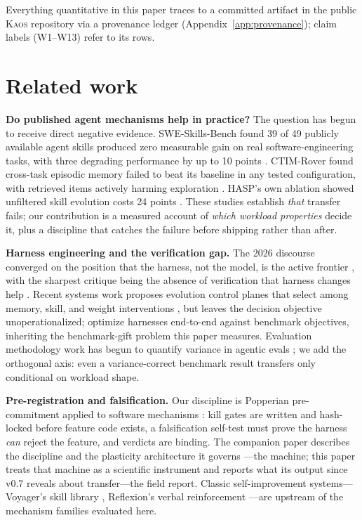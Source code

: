 \documentclass[11pt]{article}
\newcommand{\kaos}{\textsc{Kaos}}
\begin{document}
Everything quantitative in this paper traces to a committed artifact in the public \kaos{} repository via a provenance ledger (Appendix~\ref{app:provenance}); claim labels (W1--W13) refer to its rows.

\section{Related work}

\textbf{Do published agent mechanisms help in practice?} The question has begun to receive direct negative evidence. SWE-Skills-Bench found 39 of 49 publicly available agent skills produced zero measurable gain on real software-engineering tasks, with three degrading performance by up to 10 points \citep{sweskills2026}. CTIM-Rover found cross-task episodic memory failed to beat its baseline in any tested configuration, with retrieved items actively harming exploration \citep{ctimrover2025}. HASP's own ablation showed unfiltered skill evolution costs 24 points \citep{hasp2026}. These studies establish \emph{that} transfer fails; our contribution is a measured account of \emph{which workload properties} decide it, plus a discipline that catches the failure before shipping rather than after.

\textbf{Harness engineering and the verification gap.} The 2026 discourse converged on the position that the harness, not the model, is the active frontier \citep{hashimoto2026journey, osmani2026harness, zhou2026externalization}, with the sharpest critique being the absence of verification that harness changes help \citep{bockeler2026harness}. Recent systems work proposes evolution control planes that select among memory, skill, and weight interventions \citep{areal2026}, but leaves the decision objective unoperationalized; \citet{metaharness2026} optimize harnesses end-to-end against benchmark objectives, inheriting the benchmark-gift problem this paper measures. Evaluation methodology work has begun to quantify variance in agentic evals \citep{multirun2026}; we add the orthogonal axis: even a variance-correct benchmark result transfers only conditional on workload shape.

\textbf{Pre-registration and falsification.} Our discipline is Popperian pre-commitment applied to software mechanisms \citep{popper1959logic}: kill gates are written and hash-locked before feature code exists, a falsification self-test must prove the harness \emph{can} reject the feature, and verdicts are binding. The companion paper describes the discipline and the plasticity architecture it governs \citep{canivel2026plasticity}---the machine; this paper treats that machine as a scientific instrument and reports what its output since v0.7 reveals about transfer---the field report. Classic self-improvement systems---Voyager's skill library \citep{wang2023voyager}, Reflexion's verbal reinforcement \citep{shinn2023reflexion}---are upstream of the mechanism families evaluated here.
\end{document}
